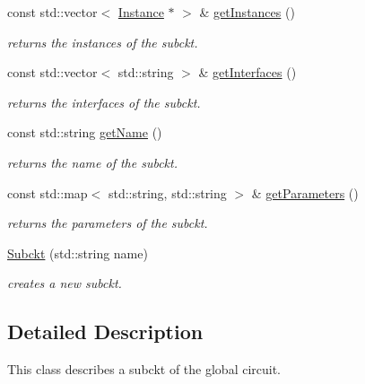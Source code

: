 \begin{DoxyCompactItemize}
const std\+::vector$<$ \mbox{\hyperlink{class_s_p_i_c_e_1_1_instance}{Instance}} $\ast$ $>$ \& \mbox{\hyperlink{class_s_p_i_c_e_1_1_subckt_a8e6e58ffab876152a740092520c35d73}{get\+Instances}} ()
\begin{DoxyCompactList}\small\item\em returns the instances of the subckt. \end{DoxyCompactList}\item 
\mbox{\label{class_s_p_i_c_e_1_1_subckt_a5df00fe6eb5e287abef28c76ce88bd1e}} 
const std\+::vector$<$ std\+::string $>$ \& \mbox{\hyperlink{class_s_p_i_c_e_1_1_subckt_a5df00fe6eb5e287abef28c76ce88bd1e}{get\+Interfaces}} ()
\begin{DoxyCompactList}\small\item\em returns the interfaces of the subckt. \end{DoxyCompactList}\item 
\mbox{\label{class_s_p_i_c_e_1_1_subckt_af55b1fe10eacd22c7ff3544b5ed32ef3}} 
const std\+::string \mbox{\hyperlink{class_s_p_i_c_e_1_1_subckt_af55b1fe10eacd22c7ff3544b5ed32ef3}{get\+Name}} ()
\begin{DoxyCompactList}\small\item\em returns the name of the subckt. \end{DoxyCompactList}\item 
\mbox{\label{class_s_p_i_c_e_1_1_subckt_aee7d59083b78d31ac5c19ab508da91e0}} 
const std\+::map$<$ std\+::string, std\+::string $>$ \& \mbox{\hyperlink{class_s_p_i_c_e_1_1_subckt_aee7d59083b78d31ac5c19ab508da91e0}{get\+Parameters}} ()
\begin{DoxyCompactList}\small\item\em returns the parameters of the subckt. \end{DoxyCompactList}\item 
\mbox{\hyperlink{class_s_p_i_c_e_1_1_subckt_a5b9ee31a0302af435029f29a93b29d7d}{Subckt}} (std\+::string name)
\begin{DoxyCompactList}\small\item\em creates a new subckt. \end{DoxyCompactList}\end{DoxyCompactItemize}


\subsection{Detailed Description}
This class describes a subckt of the global circuit. 

